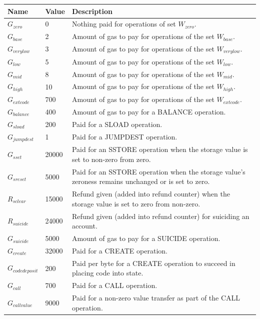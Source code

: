 \documentclass{article}
\begin{document}
		\begin{tabular}{| l | l | l |}
			\hline
			Name 				& Value 	& Description \\ \hline
			$G_{zero}$ 			& 0 		& Nothing paid for operations of set $W_{zero}$. \\ \hline
			$G_{base}$ 			& 2 		& Amount of gas to pay for operations of the set $W_{base}$. \\ \hline
			$G_{verylow}$ 		& 3 		& Amount of gas to pay for operations of the set $W_{verylow}$. \\ \hline
			$G_{low}$ 			& 5 		& Amount of gas to pay for operations of the set $W_{low}$. \\ \hline
			$G_{mid}$ 			& 8 		& Amount of gas to pay for operations of the set $W_{mid}$. \\ \hline
			$G_{high}$ 			& 10 		& Amount of gas to pay for operations of the set $W_{high}$. \\ \hline
			$G_{extcode}$ 		& 700 		& Amount of gas to pay for operations of the set $W_{extcode}$. \\ \hline
			$G_{balance}$ 		& 400 		& Amount of gas to pay for a BALANCE operation. \\ \hline
			$G_{sload}$ 		& 200 		& Paid for a SLOAD operation. \\ \hline
			$G_{jumpdest}$ 		& 1 		& Paid for a JUMPDEST operation. \\ \hline
			$G_{sset}$ 			& 20000 	& Paid for an SSTORE operation when the storage value is set to non-zero from zero. \\ \hline
			$G_{sreset}$ 		& 5000 		& Paid for an SSTORE operation when the storage value's zeroness remains unchanged or is set to zero. \\ \hline
			$R_{sclear}$ 		& 15000		& Refund given (added into refund counter) when the storage value is set to zero from non-zero. \\ \hline
			$R_{suicide}$ 		& 24000 	& Refund given (added into refund counter) for suiciding an account. \\ \hline
			$G_{suicide}$ 		& 5000 		& Amount of gas to pay for a SUICIDE operation. \\ \hline
			$G_{create}$ 		& 32000		& Paid for a CREATE operation. \\ \hline
			$G_{codedeposit}$ 	& 200 		& Paid per byte for a CREATE operation to succeed in placing code into state. \\ \hline
			$G_{call}$ 			& 700		& Paid for a CALL operation. \\ \hline
			$G_{callvalue}$ 	& 9000		& Paid for a non-zero value transfer as part of the CALL operation. \\ \hline

\end{tabular}
\end{document}
